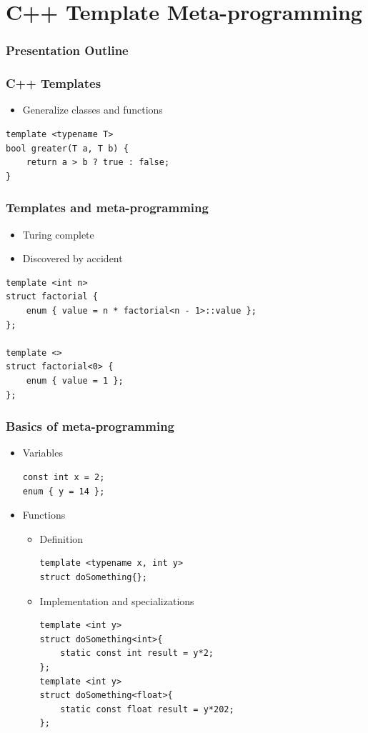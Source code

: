 \documentclass{beamer}
\begin{document}
\section{C++ Template Meta-programming}
\begin{frame}[fragile]
\frametitle{Presentation Outline}
\tableofcontents[currentsection]
\end{frame}

\begin{frame}[fragile]
\frametitle{C++ Templates}
\begin{itemize}
\item Generalize classes and functions
\end{itemize}

\begin{lstlisting}
template <typename T>
bool greater(T a, T b) {
    return a > b ? true : false;
}
\end{lstlisting}

\end{frame}

\begin{frame}[fragile]
\frametitle{Templates and meta-programming}
\begin{itemize}
\item Turing complete
\item Discovered by accident
\end{itemize}

\begin{lstlisting}
template <int n>
struct factorial {
	enum { value = n * factorial<n - 1>::value };
};
 
template <>
struct factorial<0> {
	enum { value = 1 };
};
\end{lstlisting}
\end{frame}


\begin{frame}[fragile]
\frametitle{Basics of meta-programming}
\begin{itemize}
\vspace*{-0.4cm}
\item Variables
\begin{lstlisting}
const int x = 2;
enum { y = 14 };
\end{lstlisting}
\item Functions
\begin{itemize}
\item Definition
\begin{lstlisting}
template <typename x, int y>
struct doSomething{};
\end{lstlisting}
\item Implementation and specializations
\begin{lstlisting}
template <int y>
struct doSomething<int>{
    static const int result = y*2;
};
template <int y>
struct doSomething<float>{
    static const float result = y*202;
};
\end{lstlisting}
\end{itemize}
\end{itemize}


\end{frame}
\end{document}
